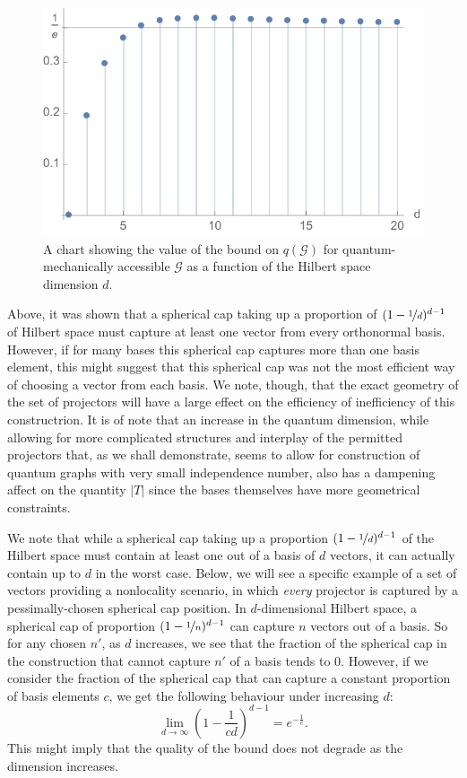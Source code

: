 \documentclass{amsart}
\theoremstyle{definition}
\begin{document}
\begin{figure}
\begin{center}
\includegraphics{boundgraph}
\caption{A chart showing the value of the bound on $q(\mathcal{G})$ for quantum-mechanically accessible $\mathcal{G}$ as a function of the Hilbert space dimension $d$.}
\label{boundgraph}
\end{center}
\end{figure}
Above, it was shown that a spherical cap taking up a proportion of $(1-\nicefrac1d)^{d-1}$ of Hilbert space must capture at least one vector from every orthonormal basis. However, if for many bases this spherical cap captures more than one basis element, this might suggest that this spherical cap was not the most efficient way of choosing a vector from each basis. We note, though, that the exact geometry of the set of projectors will have a large effect on the efficiency of inefficiency of this constructrion. It is of note that an increase in the quantum dimension, while allowing for more complicated structures and interplay of the permitted projectors that, as we shall demonstrate, seems to allow for construction of quantum graphs with very small independence number, also has a dampening affect on the quantity $|T|$ since the bases themselves have more geometrical constraints.

We note that while a spherical cap taking up a proportion $(1-\nicefrac1d)^{d-1}$ of the Hilbert space must contain at least one out of a basis of $d$ vectors, it can actually contain up to $d$ in the worst case. Below, we will see a specific example of a set of vectors providing a nonlocality scenario, in which \emph{every} projector is captured by a pessimally-chosen spherical cap position. In $d$-dimensional Hilbert space, a spherical cap of proportion $(1-\nicefrac1n)^{d-1}$ can capture $n$ vectors out of a basis. So for any chosen $n'$, as $d$ increases, we see that the fraction of the spherical cap in the construction that cannot capture $n'$ of a basis tends to 0. However, if we consider the fraction of the spherical cap that can capture a constant proportion of basis elements $c$, we get the following behaviour under increasing $d$:
\begin{equation}
\lim_{d\rightarrow\infty} \left(1-\frac{1}{cd}\right)^{d-1}=e^{-\frac1c}.
\end{equation}
This might imply that the quality of the bound does not degrade as the dimension increases.%
\end{document}
